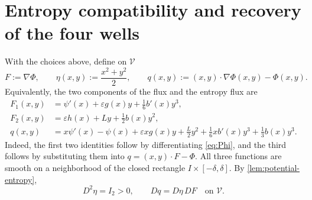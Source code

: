 \documentclass[11pt,reqno]{amsart}
\theoremstyle{definition}
\newcommand{\V}{\mathcal{V}}
\begin{document}
\section{Entropy compatibility and recovery of the four wells}
\label{sec:recovery}

With the choices above, define on $\V$
\begin{equation}
  F:=\nabla\Phi,
  \qquad
  \eta(x,y):=\frac{x^2+y^2}{2},
  \qquad
  q(x,y):=(x,y)\cdot\nabla\Phi(x,y)-\Phi(x,y).
  \label{eq:final-F-eta-q}
\end{equation}
Equivalently, the two components of the flux and the entropy flux are
\begin{align}
  F_1(x,y)
  &=\psi'(x)+\varepsilon g(x)y+\frac16b'(x)y^3,
  \label{eq:explicit-F1}\\
  F_2(x,y)
  &=\varepsilon h(x)+Ly+\frac12b(x)y^2,
  \label{eq:explicit-F2}\\
  q(x,y)
  &=x\psi'(x)-\psi(x)+\varepsilon xg(x)y+\frac{L}{2}y^2
    +\frac16xb'(x)y^3+\frac13b(x)y^3.
  \label{eq:explicit-q}
\end{align}
Indeed, the first two identities follow by differentiating
\cref{eq:Phi}, and the third follows by substituting them into
$q=(x,y)\cdot F-\Phi$.
All three functions are smooth on a neighborhood of the closed rectangle
$I\times[-\delta,\delta]$.  By \cref{lem:potential-entropy},
\begin{equation}
  D^2\eta=I_2>0,
  \qquad
  Dq=D\eta\,DF
  \quad\text{on }\V.
  \label{eq:final-entropy-check}
\end{equation}
\end{document}
